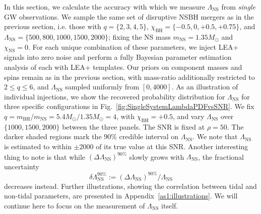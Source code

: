 \documentclass[aps,prd,amsmath,floats,floatfix, twocolumn,
superscriptaddress,nofootinbib,showpacs]{revtex4-1}
\newcommand{\lambdans}{\Lambda_\mathrm{NS}}
\newcommand{\chibh}{\chi_\mathrm{BH}}
\newcommand{\chins}{\chi_\mathrm{NS}}
\newcommand{\mbh}{m_\mathrm{BH}}
\newcommand{\mns}{m_\mathrm{NS}}
\begin{document}
In this section, we calculate the accuracy with which we measure $\lambdans$ from
{\it single} GW observations. We sample the same set of disruptive NSBH mergers
as in the previous section, i.e. those with $q=\{2,3,4,5\}$,
$\chibh=\{-0.5,0,+0.5,+0.75\}$, and $\lambdans=\{500, 800, 1000, 1500, 2000\}$;
fixing the NS mass $\mns=1.35 M_\odot$ and $\chins=0$. For each unique
combination of these parameters, we inject LEA+ signals into zero noise and
perform a fully Bayesian parameter estimation analysis of each with LEA+
templates. Our  priors on component masses and spins remain as in the
previous section, with mass-ratio additionally restricted to $2\leq q\leq 6$,
and $\lambdans$ sampled uniformly from $[0,4000]$.
% 
%
As an illustration of individual injections, we show the recovered probability
distribution for $\lambdans$ for three specific configurations in 
Fig.~\ref{fig:SingleSystemLambdaPDFvsSNR}. We fix
$q = \mbh /\mns = 5.4M_\odot/1.35M_\odot = 4$, with $\chibh=+0.5$, and
vary $\lambdans$ over $\{1000, 1500, 2000\}$ between the three panels.
The SNR is fixed at $\rho=50$. The darker shaded regions mark the $90\%$ credible
interval on $\lambdans$. We note that $\lambdans$ is estimated to within
$\pm 2000$ of its true value at this SNR. Another interesting thing to note 
is that while $(\Delta\lambdans)^{90\%}$ slowly grows with $\lambdans$, the
fractional uncertainty
\begin{equation}
\delta\lambdans^{90\%}:= (\Delta\lambdans)^{90\%}/\lambdans
\end{equation}
decreases instead.
%
Further illustrations, showing the correlation between tidal and non-tidal
parameters, are presented in Appendix~\ref{as1:illustrations}.
We will continue here to focus on the measurement of $\lambdans$ itself.
\end{document}
